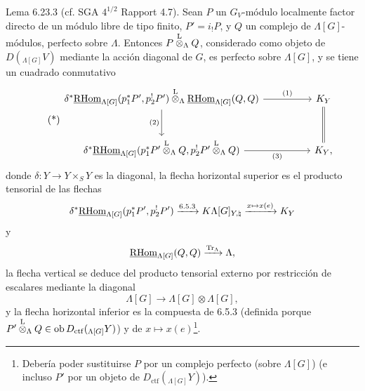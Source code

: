 \begin{statement}{Lema 6.23.3}
(cf. SGA $4^{1/2}$ Rapport 4.7). Sean $P$ un $G_V$-módulo localmente factor directo de un módulo libre de tipo finito, $P'=i_!P$, y $Q$ un complejo de $\Lambda[G]$-módulos, perfecto sobre $\Lambda$. Entonces $P\overset{\mathrm L}{\otimes}_{\Lambda}Q$, considerado como objeto de $D({}_{\Lambda[G]}V)$ mediante la acción diagonal de $G$, es perfecto sobre $\Lambda[G]$, y se tiene un cuadrado conmutativo
\begin{equation}
\tag{*}
\begin{tikzcd}[column sep=huge,row sep=large]
\delta^*\uRHom_{\Lambda[G]}(p_1^*P',p_2^!P')\lten_{\Lambda}
\uRHom_{\Lambda[G]}(Q,Q) \arrow[r,"(1)"] \arrow[d,"(2)"']
& K_Y \arrow[d,equal]\\
\delta^*\uRHom_{\Lambda[G]}(p_1^*P'\lten_{\Lambda}Q,p_2^!P'\lten_{\Lambda}Q) \arrow[r,"(3)"']
& K_Y ,
\end{tikzcd}
\end{equation}
donde $\delta:Y\to Y\times_SY$ es la diagonal, la flecha horizontal superior es el producto tensorial de las flechas
\[
\delta^*\underline{\mathrm{RHom}}_{\Lambda[G]}(p_1^*P',p_2^!P')\xrightarrow{6.5.3}
K\Lambda[G]_{Y,\natural}\xrightarrow{x\mapsto x(e)}K_Y
\]
y
\[
\underline{\mathrm{RHom}}_{\Lambda[G]}(Q,Q)\xrightarrow{\operatorname{Tr}_{\Lambda}}\Lambda,
\]
la flecha vertical se deduce del producto tensorial externo por restricción de escalares mediante la diagonal
\[
\Lambda[G]\to\Lambda[G]\otimes\Lambda[G],
\]
y la flecha horizontal inferior es la compuesta de 6.5.3 (definida porque $P'\overset{\mathrm L}{\otimes}_{\Lambda}Q\in\operatorname{ob} D_{\mathrm{ctf}}({}_{\Lambda[G]}Y)$) y de $x\mapsto x(e)$\footnote{Debería poder sustituirse $P$ por un complejo perfecto (sobre $\Lambda[G]$) (e incluso $P'$ por un objeto de $D_{\mathrm{ctf}}({}_{\Lambda[G]}Y)$).}.
\end{statement}

